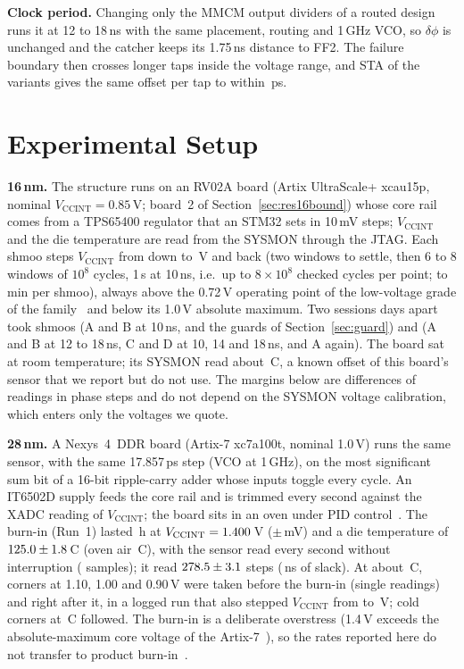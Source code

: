 \documentclass[conference]{IEEEtran}
\newcommand{\Vcc}{V_\mathrm{CCINT}}
\begin{document}
\textbf{Clock period.} Changing only the MMCM output dividers of a routed design runs it at 12 to
18\,ns with the same placement, routing and 1\,GHz VCO, so $\delta\phi$ is unchanged and the catcher
keeps its 1.75\,ns distance to FF2. The failure boundary then crosses longer taps inside the voltage
range, and STA of the variants gives the same offset per tap to within \vPeriodDstMaxPs\,ps.

\section{Experimental Setup}\label{sec:setup}

\textbf{16\,nm.} The structure runs on an RV02A board (Artix UltraScale+ xcau15p, nominal
$\Vcc=0.85$\,V; board~2 of Section~\ref{sec:res16bound}) whose core rail comes from a TPS65400
regulator that an STM32 sets in 10\,mV steps; $\Vcc$ and the die temperature are read from the
SYSMON through the JTAG. Each shmoo steps $\Vcc$ from \vTapVhi{} down to \vTapVlo\,V and back (two
windows to settle, then 6 to 8 windows of $10^{8}$ cycles, 1\,s at 10\,ns, i.e.\ up to
$8\times10^{8}$ checked cycles per point; \vShmooMinLo{} to \vShmooMinHi\,min per shmoo), always
above the 0.72\,V operating point of the low-voltage grade of the family~\cite{ds931} and below its
1.0\,V absolute maximum. Two sessions \vSessGapDays{} days apart took \vShmoosFirst{} shmoos (A and B
at 10\,ns, and the guards of Section~\ref{sec:guard}) and \vShmoosSecond{} (A and B at 12 to 18\,ns,
C and D at 10, 14 and 18\,ns, and A again). The board sat at room temperature; its
SYSMON read about \vTapDie\,\textdegree C, a known offset of this board's sensor that we report but
do not use. The margins below are differences of readings in phase steps and do not depend on the
SYSMON voltage calibration, which enters only the voltages we quote.

\textbf{28\,nm.} A Nexys~4~DDR board (Artix-7 xc7a100t, nominal 1.0\,V) runs the same sensor, with
the same 17.857\,ps step (VCO at 1\,GHz), on the most significant sum bit of a 16-bit ripple-carry
adder whose inputs toggle every cycle. An IT6502D supply feeds the core rail and is trimmed every second against
the XADC reading of $\Vcc$; the board sits in an oven under PID control~\cite{sbcci26}. The burn-in
(Run~1) lasted \vRunDurH\,h at $\Vcc=\vRunV$\,V ($\pm$\vRunVsdmV\,mV) and a die temperature of
$125.0\pm1.8$\,\textdegree C (oven air \vRunOven\,\textdegree C), with the sensor read every
second without interruption (\vRunN{} samples); it read $278.5\pm3.1$ steps
(\vRunSlackNs\,ns of slack). At about \vPreT\,\textdegree C, corners at 1.10, 1.00 and 0.90\,V were
taken before the burn-in (single readings) and right after it, in a logged run that also stepped
$\Vcc$ from \vSweepHi{} to \vSweepLo\,V; cold corners at \vColdT\,\textdegree C followed. The burn-in
is a deliberate overstress (1.4\,V exceeds the absolute-maximum core voltage of the
Artix-7~\cite{ds181}), so the rates reported here do not transfer to product
burn-in~\cite{jesd22a108}.
\end{document}
